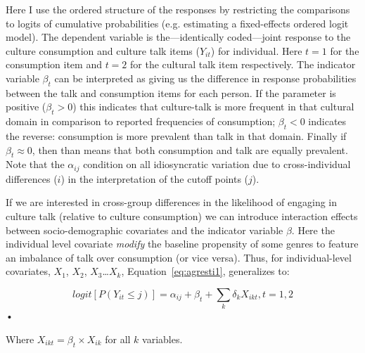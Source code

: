 Here I use the ordered structure of the responses by restricting the comparisons to logits of cumulative probabilities (e.g. estimating a fixed-effects ordered logit model).  The dependent variable is the---identically coded---joint response to the culture consumption and culture talk items ($Y_{it}$) for individual.  Here $t=1$ for the consumption item and $t=2$ for the cultural talk item respectively.  The indicator variable $\beta_t$ can be interpreted as giving us the difference in response probabilities between the talk and consumption items for each person.   If the parameter is positive ($\beta_t>0$) this indicates that culture-talk is more frequent in that cultural domain in comparison to reported frequencies of consumption;  $\beta_t<0$ indicates the reverse: consumption is more prevalent than talk in that domain.  Finally if $\beta_t \approx 0$, then than means that both consumption and talk are equally prevalent. Note that the $\alpha_{ij}$ condition on all idiosyncratic variation due to cross-individual differences ($i$) in the interpretation of the cutoff points ($j$).

If we are interested in cross-group differences in the likelihood of engaging in culture talk (relative to culture consumption) we can introduce interaction effects between socio-demographic covariates and the indicator variable $\beta$.  Here the individual level covariate \emph{modify} the baseline propensity of some genres to feature an imbalance of talk over consumption (or vice versa).  Thus, for individual-level covariates, $X_1$, $X_2$, $X_3${\ldots}$X_k$, Equation~\ref{eq:agresti1}, generalizes to:

\begin{equation}
logit[P(Y_{it}\leq j)]=\alpha_{ij} + \beta_t+\sum_k\delta_kX_{ikt}, t=1,2
\label{eq:agresti1}
\end{equation}•

Where $X_{ikt}=\beta_t \times X_{ik}$ for all $k$ variables.  
